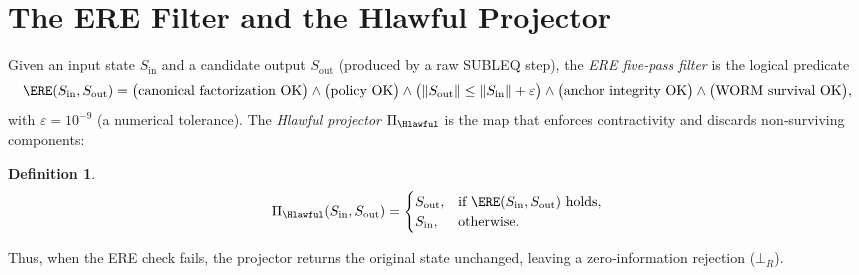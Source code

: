 \documentclass[11pt,a4paper]{article}
\theoremstyle{definition}
\newtheorem{definition}[theorem]{Definition}
\theoremstyle{remark}
\newcommand{\norm}[1]{\|#1\|}
\begin{document}
\section{The ERE Filter and the Hlawful Projector}
\label{sec:ere}
Given an input state $S_{\text{in}}$ and a candidate output $S_{\text{out}}$ (produced by a raw SUBLEQ step), the \emph{ERE five‑pass filter} is the logical predicate
\[
\ERE(S_{\text{in}}, S_{\text{out}}) = 
\bigl(\text{canonical factorization OK}\bigr) \land 
\bigl(\text{policy OK}\bigr) \land 
\bigl( \norm{S_{\text{out}}} \le \norm{S_{\text{in}}} + \varepsilon \bigr) \land 
\bigl(\text{anchor integrity OK}\bigr) \land 
\bigl(\text{WORM survival OK}\bigr),
\]
with $\varepsilon = 10^{-9}$ (a numerical tolerance).  
The \emph{Hlawful projector} $\Pi_{\Hlawful}$ is the map that enforces contractivity and discards non‑surviving components:
\begin{definition}\label{def:Hlawful}
\[
\Pi_{\Hlawful}(S_{\text{in}}, S_{\text{out}}) = 
\begin{cases}
S_{\text{out}}, & \text{if } \ERE(S_{\text{in}}, S_{\text{out}}) \text{ holds}, \\
S_{\text{in}},  & \text{otherwise}.
\end{cases}
\]
\end{definition}
Thus, when the ERE check fails, the projector returns the original state unchanged, leaving a zero‑information rejection ($\bot_R$).
\end{document}

